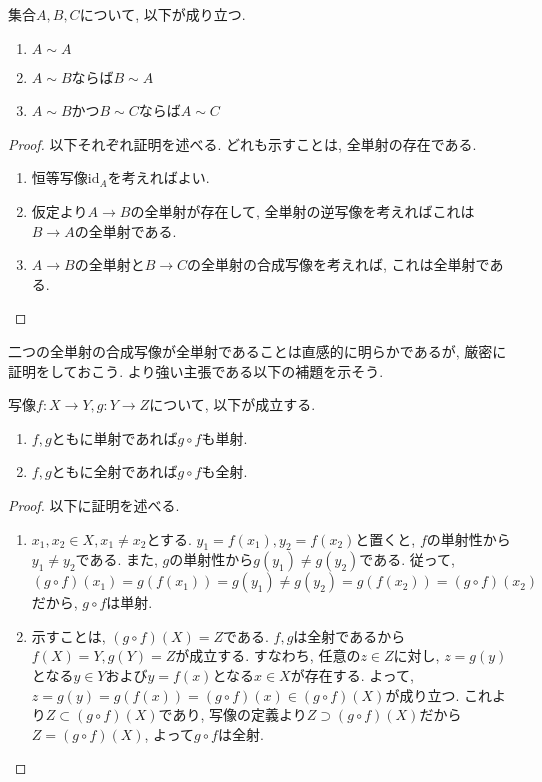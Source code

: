             集合$A,B,C$について, 以下が成り立つ.
            \begin{enumerate}\renewcommand{\labelenumi}{(\arabic{enumi})}
                \item $A\sim A$
                \item $A\sim B$ならば$B\sim A$
                \item $A\sim B$かつ$B\sim C$ならば$A\sim C$
            \end{enumerate}
            \begin{proof}以下それぞれ証明を述べる. どれも示すことは, 全単射の存在である.
                \begin{enumerate}\renewcommand{\labelenumi}{(\arabic{enumi})}
                    \item 恒等写像$\mathrm{id}_A$を考えればよい.
                    \item 仮定より$A\rightarrow B$の全単射が存在して, 全単射の逆写像を考えればこれは$B\rightarrow A$の全単射である.
                    \item $A\rightarrow B$の全単射と$B\rightarrow C$の全単射の合成写像を考えれば, これは全単射である.
                \end{enumerate}
            \end{proof}
            二つの全単射の合成写像が全単射であることは直感的に明らかであるが, 厳密に証明をしておこう. より強い主張である以下の補題を示そう.
            \begin{screen}
                写像$f:X\rightarrow Y,g:Y\rightarrow Z$について, 以下が成立する.
                \begin{enumerate}\renewcommand{\labelenumi}{(\roman{enumi})}
                    \item $f,g$ともに単射であれば$g\circ f$も単射.
                    \item $f,g$ともに全射であれば$g\circ f$も全射.
                \end{enumerate}
            \end{screen}
            \begin{proof}以下に証明を述べる.
                \begin{enumerate}\renewcommand{\labelenumi}{(\roman{enumi})}
                    \item $x_1,x_2\in X,x_1\neq x_2$とする. $y_1=f(x_1),y_2=f(x_2)$と置くと, $f$の単射性から$y_1\neq y_2$である. また, $g$の単射性から$g(y_1)\neq g(y_2)$である. 
                    従って, $(g\circ f)(x_1)=g(f(x_1))=g(y_1)\neq g(y_2)=g(f(x_2))=(g\circ f)(x_2)$だから, $g\circ f$は単射.
                    \item 示すことは, $(g\circ f)(X)=Z$である. $f,g$は全射であるから$f(X)=Y,g(Y)=Z$が成立する. すなわち, 任意の$z\in Z$に対し, $z=g(y)$となる$y\in Y$および$y=f(x)$となる$x\in X$が存在する.
                    よって, $z=g(y)=g(f(x))=(g\circ f)(x)\in (g\circ f)(X)$が成り立つ. これより$Z\subset (g\circ f)(X)$であり, 写像の定義より$Z\supset (g\circ f)(X)$だから$Z=(g\circ f)(X)$, よって$g\circ f$は全射.
                \end{enumerate}
            \end{proof}
